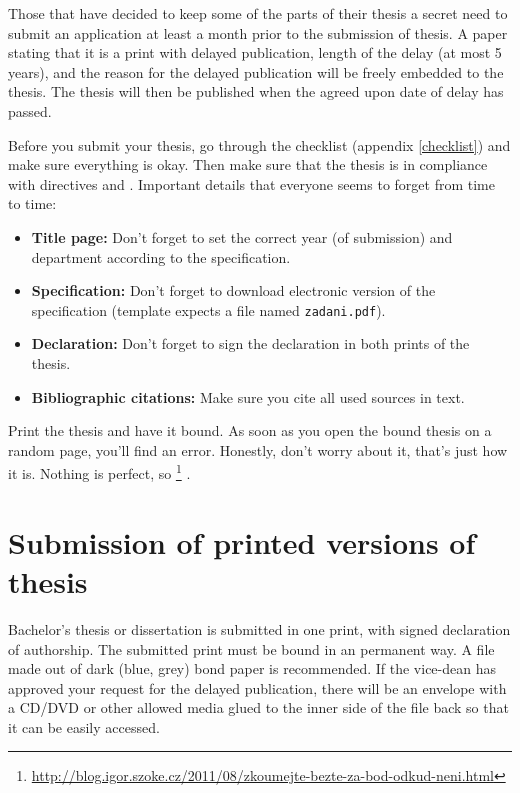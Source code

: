 Those that have decided to keep some of the parts of their thesis a secret need to submit an application at least a month prior to the submission of thesis. A paper stating that it is a print with delayed publication, length of the delay (at most 5 years), and the reason for the delayed publication will be freely embedded to the thesis. The thesis will then be published when the agreed upon date of delay has passed. 

Before you submit your thesis, go through the checklist (appendix \ref{checklist}) and make sure everything is okay. Then make sure that the thesis is in compliance with directives \cite{smernice} and \cite{smerniceFIT}. Important details that everyone seems to forget from time to time:
\begin{itemize}
	\item \textbf{Title page:}  Don't forget to set the correct year (of submission) and department according to the specification.
	\item \textbf{Specification:} Don't forget to download electronic version of the specification (template expects a file named \texttt{zadani.pdf}).
    \item \textbf{Declaration:} Don't forget to sign the declaration in both prints of the thesis.
    \item \textbf{Bibliographic citations:} Make sure you cite all used sources in text.
\end{itemize}

Print the thesis and have it bound. As soon as you open the bound thesis on a random page, you'll find an error. Honestly, don't worry about it, that's just how it is. Nothing is perfect, so \footnote{\url{http://blog.igor.szoke.cz/2011/08/zkoumejte-bezte-za-bod-odkud-neni.html}} \cite{rady}.

\section{Submission of printed versions of thesis}
Bachelor's thesis or dissertation is submitted in one print, with signed declaration of authorship. The submitted print must be bound in an permanent way. A file made out of dark (blue, grey) bond paper is recommended. If the vice-dean has approved your request for the delayed publication, there will be an envelope with a CD/DVD or other allowed media glued to the inner side of the file back so that it can be easily accessed. 

